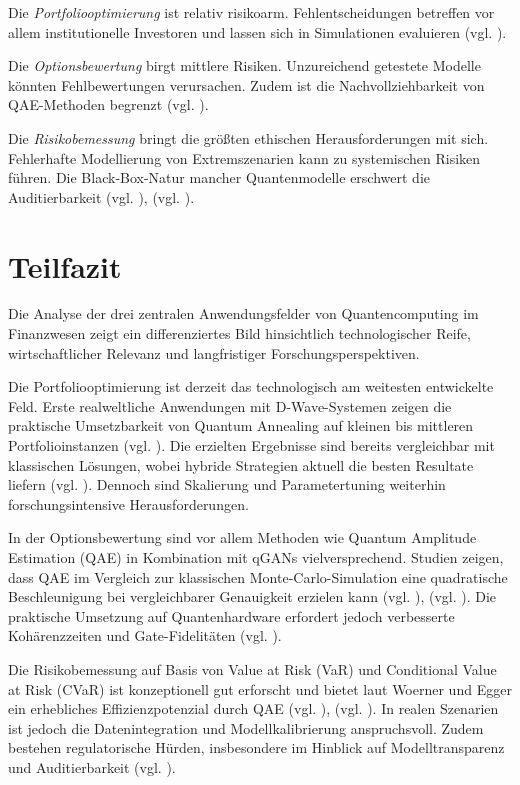 {Die \textit{Portfoliooptimierung} ist relativ risikoarm. Fehlentscheidungen betreffen vor allem institutionelle Investoren und lassen sich in Simulationen evaluieren (vgl. \cite{sakuler_real-world_2025}).

Die \textit{Optionsbewertung} birgt mittlere Risiken. Unzureichend getestete Modelle könnten Fehlbewertungen verursachen. Zudem ist die Nachvollziehbarkeit von QAE-Methoden begrenzt (vgl. \cite{stamatopoulos_option_2020}).

Die \textit{Risikobemessung} bringt die größten ethischen Herausforderungen mit sich. Fehlerhafte Modellierung von Extremszenarien kann zu systemischen Risiken führen. Die Black-Box-Natur mancher Quantenmodelle erschwert die Auditierbarkeit (vgl. \cite{orus_quantum_2019}), (vgl. \cite{zoufal_quantum_2019}).

\section{Teilfazit}

Die Analyse der drei zentralen Anwendungsfelder von Quantencomputing im Finanzwesen zeigt ein differenziertes Bild hinsichtlich technologischer Reife, wirtschaftlicher Relevanz und langfristiger Forschungsperspektiven.

Die Portfoliooptimierung ist derzeit das technologisch am weitesten entwickelte Feld. Erste realweltliche Anwendungen mit D-Wave-Systemen zeigen die praktische Umsetzbarkeit von Quantum Annealing auf kleinen bis mittleren Portfolioinstanzen (vgl. \cite{sakuler_real-world_2025}). Die erzielten Ergebnisse sind bereits vergleichbar mit klassischen Lösungen, wobei hybride Strategien aktuell die besten Resultate liefern (vgl. \cite{sakuler_real-world_2025}). Dennoch sind Skalierung und Parametertuning weiterhin forschungsintensive Herausforderungen.

In der Optionsbewertung sind vor allem Methoden wie Quantum Amplitude Estimation (QAE) in Kombination mit qGANs vielversprechend. Studien zeigen, dass QAE im Vergleich zur klassischen Monte-Carlo-Simulation eine quadratische Beschleunigung bei vergleichbarer Genauigkeit erzielen kann (vgl. \cite{zoufal_quantum_2019}), (vgl. \cite{stamatopoulos_option_2020}). Die praktische Umsetzung auf Quantenhardware erfordert jedoch verbesserte Kohärenzzeiten und Gate-Fidelitäten (vgl. \cite{zoufal_quantum_2019}).

Die Risikobemessung auf Basis von Value at Risk (VaR) und Conditional Value at Risk (CVaR) ist konzeptionell gut erforscht und bietet laut Woerner und Egger ein erhebliches Effizienzpotenzial durch QAE (vgl. \cite{orus_quantum_2019}), (vgl. \cite{zhou_quantum_2025}). In realen Szenarien ist jedoch die Datenintegration und Modellkalibrierung anspruchsvoll. Zudem bestehen regulatorische Hürden, insbesondere im Hinblick auf Modelltransparenz und Auditierbarkeit (vgl. \cite{egger_quantum_2020}).

}
